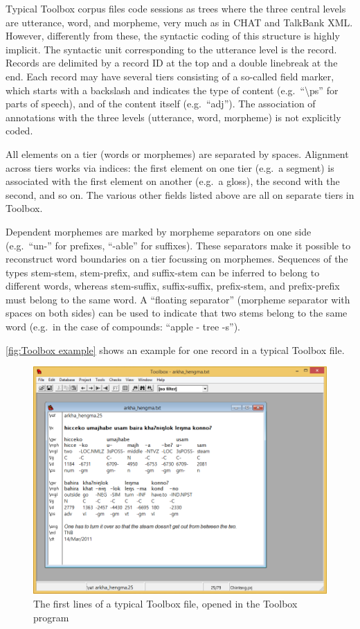 \documentclass[a4paper, 11pt]{book}
\begin{document}
Typical Toolbox corpus files code sessions as trees where the three central levels are utterance, word, and morpheme, very much as in CHAT and TalkBank XML. However, differently from these, the syntactic coding of this structure is highly implicit. The syntactic unit corresponding to the utterance level is the record. Records are delimited by a record ID at the top and a double linebreak at the end. Each record may have several tiers consisting of a so-called field marker, which starts with a backslash and indicates the type of content (e.g.\ “\textbackslash ps” for parts of speech), and of the content itself (e.g.\ “adj”). The association of annotations with the three levels (utterance, word, morpheme) is not explicitly coded.

All elements on a tier (words or morphemes) are separated by spaces. Alignment across tiers works via indices: the first element on one tier (e.g.\ a segment) is associated with the first element on another (e.g.\ a gloss), the second with the second, and so on. The various other fields listed above are all on separate tiers in Toolbox.

Dependent morphemes are marked by morpheme separators on one side (e.g.\ “un-” for prefixes, “-able” for suffixes). These separators make it possible to reconstruct word boundaries on a tier focussing on morphemes. Sequences of the types stem-stem, stem-prefix, and suffix-stem can be inferred to belong to different words,  whereas stem-suffix, suffix-suffix, prefix-stem, and prefix-prefix must belong to the same word. A “floating separator” (morpheme separator with spaces on both sides) can be used to indicate that two stems belong to the same word (e.g.\ in the case of compounds: “apple - tree -s”). 

\autoref{fig:Toolbox example} shows an example for one record in a typical Toolbox file. 

\begin{figure}[ht!]
	\centering
	\includegraphics[scale=0.45]{pics/toolbox-screenshot.png}
	\caption{The first lines of a typical Toolbox file, opened in the Toolbox program}
	\label{fig:Toolbox example}
\end{figure}
\end{document}
